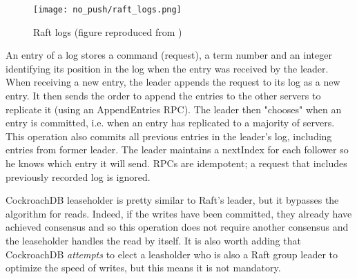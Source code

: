\begin{figure}[H]
  \vspace{-10pt}
  \centering
  \centerline{\texttt{[image: no\_push/raft\_logs.png]}}
  \vspace{-5pt}
  \caption{Raft logs (figure reproduced from \cite{DBLP:conf/usenix/OngaroO14})}
  \vspace{-5pt}
  \label{fig:raft-log}
\end{figure}


An entry of a log stores a command (request), a term number and an integer identifying its position in the log when the entry was received by the leader. When receiving a new entry, the leader appends the request to its log as a new entry. It then sends the order to append the entries to the other servers to replicate it (using an AppendEntries RPC). The leader then "chooses" when an entry is committed, i.e. when an entry has replicated to a majority of servers. This operation also commits all previous entries in the leader's log, including entries from former leader. The leader maintains a nextIndex for each follower so he knows which entry it will send. RPCs are idempotent; a request that includes previously recorded log is ignored.


CockroachDB leaseholder is pretty similar to Raft's leader, but it bypasses the algorithm for reads. Indeed, if the writes have been committed, they already have achieved consensus and so this operation does not require another consensus and the leaseholder handles the read by itself. It is also worth adding that CockroachDB \emph{attempts} to elect a leasholder who is also a Raft group leader to optimize the speed of writes, but this means it is not mandatory\cite{CRDB:replication-layer}.
